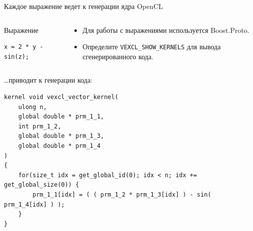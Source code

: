 \documentclass[@BEAMER_OPTIONS@]{beamer}
\newcommand{\code}[1]{\lstinline|#1|}
\begin{document}

\begin{frame}[fragile]{Каждое выражение ведет к генерации ядра OpenCL}
    \begin{columns}
        \begin{column}{0.38\textwidth}
            \begin{exampleblock}{Выражение}
                \begin{lstlisting}
x = 2 * y - sin(z);
                \end{lstlisting}
            \end{exampleblock}
        \end{column}
        \begin{column}{0.55\textwidth}
            \begin{itemize}
                \item Для работы с выражениями используется Boost.Proto.
                \item Определите \code{VEXCL_SHOW_KERNELS} для вывода
                    сгенерированного кода.
            \end{itemize}
        \end{column}
    \end{columns}
    \begin{exampleblock}{\ldots приводит к генерации кода:}
        \begin{lstlisting}
kernel void vexcl_vector_kernel(
    ulong n,
    global double * prm_1_1,
    int prm_1_2,
    global double * prm_1_3,
    global double * prm_1_4
)
{
    for(size_t idx = get_global_id(0); idx < n; idx += get_global_size(0)) {
        prm_1_1[idx] = ( ( prm_1_2 * prm_1_3[idx] ) - sin( prm_1_4[idx] ) );
    }
}
        \end{lstlisting}
    \end{exampleblock}
\end{frame}
\end{document}
